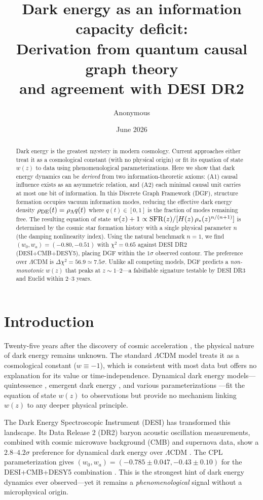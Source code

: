 \documentclass[12pt,a4paper]{article}
\title{\bf Dark energy as an information capacity deficit:\\
Derivation from quantum causal graph theory\\
and agreement with DESI DR2}
\author{Anonymous}
\date{June 2026}
\begin{document}
\maketitle

\begin{abstract}
Dark energy is the greatest mystery in modern cosmology. Current approaches either treat it as a cosmological constant (with no physical origin) or fit its equation of state $w(z)$ to data using phenomenological parameterizations. Here we show that dark energy dynamics can be {\it derived} from two information-theoretic axioms: (A1) causal influence exists as an asymmetric relation, and (A2) each minimal causal unit carries at most one bit of information. In this Discrete Graph Framework (DGF), structure formation occupies vacuum information modes, reducing the effective dark energy density $\rho_{\rm DE}(t)=\rho_\Lambda q(t)$ where $q(t)\in[0,1]$ is the fraction of modes remaining free. The resulting equation of state $w(z)+1 \propto {\rm SFR}(z)/[H(z)\,\rho_*(z)^{n/(n+1)}]$ is determined by the cosmic star formation history with a single physical parameter $n$ (the damping nonlinearity index). Using the natural benchmark $n=1$, we find $(w_0,w_a)=(-0.80,-0.51)$ with $\chi^2=0.65$ against DESI DR2 (DESI+CMB+DESY5), placing DGF within the $1\sigma$ observed contour. The preference over $\Lambda$CDM is $\Delta\chi^2=56.9\simeq7.5\sigma$. Unlike all competing models, DGF predicts a {\it non-monotonic} $w(z)$ that peaks at $z\sim1$--$2$---a falsifiable signature testable by DESI DR3 and Euclid within 2--3 years.
\end{abstract}

\section{Introduction}

Twenty-five years after the discovery of cosmic acceleration \cite{riess1998,spergel2003}, the physical nature of dark energy remains unknown. The standard $\Lambda$CDM model treats it as a cosmological constant ($w\equiv-1$), which is consistent with most data but offers no explanation for its value or time-independence. Dynamical dark energy models---quintessence \cite{tsujikawa2013}, emergent dark energy \cite{li2024}, and various parameterizations \cite{chevallier2001,finder2009}---fit the equation of state $w(z)$ to observations but provide no mechanism linking $w(z)$ to any deeper physical principle.

The Dark Energy Spectroscopic Instrument (DESI) has transformed this landscape. Its Data Release 2 (DR2) baryon acoustic oscillation measurements, combined with cosmic microwave background (CMB) and supernova data, show a $2.8$--$4.2\sigma$ preference for dynamical dark energy over $\Lambda$CDM \cite{desi2025}. The CPL parameterization \cite{chevallier2001} gives $(w_0,w_a)=(-0.785\pm0.047,-0.43\pm0.10)$ for the DESI+CMB+DESY5 combination \cite{zhang2026}. This is the strongest hint of dark energy dynamics ever observed---yet it remains a {\it phenomenological} signal without a microphysical origin.
\end{document}
